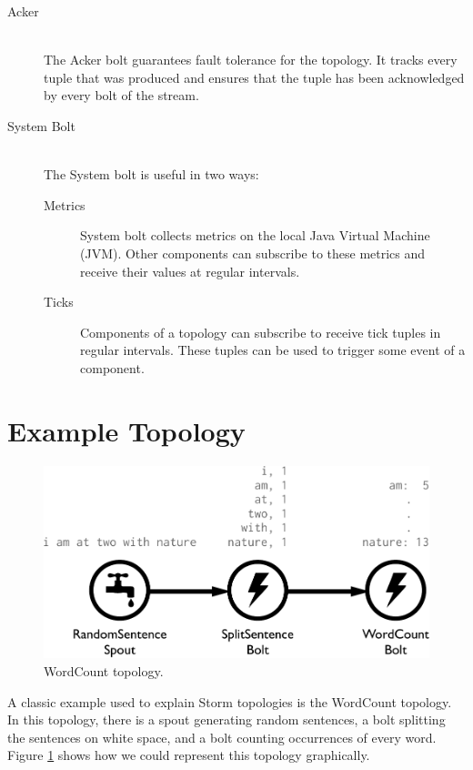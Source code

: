 \documentclass[bsc,logo,frontabs,twoside,singlespacing,normalheadings,parskip]{infthesis}\usepackage[]{graphicx}\usepackage[]{color}
\begin{document}
\begin{description}
	\item[Acker] \hfill \\
	The Acker bolt guarantees fault tolerance for the topology. It tracks every tuple that was produced and ensures that the tuple has been acknowledged by every bolt of the stream.
	\item[System Bolt] \hfill \\
	The System bolt is useful in two ways:
	\begin{description}
		\item[Metrics] System bolt collects metrics on the local Java Virtual Machine (JVM). Other components can subscribe to these metrics and receive their values at  regular intervals.
		\item[Ticks] Components of a topology can subscribe to receive tick tuples in regular intervals. These tuples can be used to trigger some event of a component.
	\end{description}
\end{description}

\section{Example Topology}
\label{sec:example_topology}

\begin{figure}[!htb]
	\centering
	\includegraphics[scale=0.6]{pdf/wordcount_topology.pdf}
	\caption{WordCount topology.}
	\label{fig:wordcount_topology}
\end{figure}

A classic example used to explain Storm topologies is the WordCount topology. In this topology, there is a spout generating random sentences, a bolt splitting the sentences on white space, and a bolt counting occurrences of every word. Figure \ref{fig:wordcount_topology} shows how we could represent this topology graphically.
\end{document}
